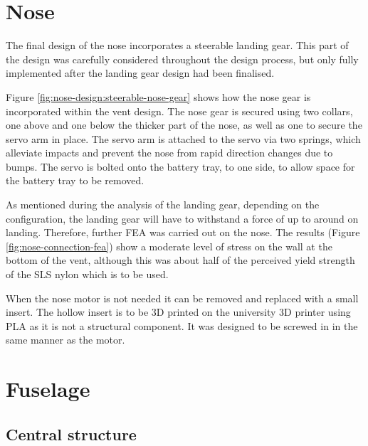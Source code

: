 \documentclass[../../main.tex]{subfiles}
\begin{document}
\section{Nose} \label{sec:final-design-proposal:nose}

The final design of the nose incorporates a steerable landing gear.
This part of the design was carefully considered throughout the design process, but only fully implemented after the landing gear design had been finalised. 


Figure \ref{fig:nose-design:steerable-nose-gear} shows how the nose gear is incorporated within the vent design.
The nose gear is secured using two collars, one above and one below the thicker part of the nose, as well as one to secure the servo arm in place.
The servo arm is attached to the servo via two springs, which alleviate impacts and prevent the nose from rapid direction changes due to bumps.
The servo is bolted onto the battery tray, to one side, to allow space for the battery tray to be removed. 

As mentioned during the analysis of the landing gear, depending on the configuration, the landing gear will have to withstand a force of up to around  on landing.
Therefore, further FEA was carried out on the nose.
The results (Figure \ref{fig:nose-connection-fea}) show a moderate level of stress on the wall at the bottom of the vent, although this was about half of the perceived yield strength of the SLS nylon which is to be used. 



When the nose motor is not needed it can be removed and replaced with a small insert.
The hollow insert is to be 3D printed on the university 3D printer using PLA as it is not a structural component.
It was designed to be screwed in in the same manner as the motor. 

\section{Fuselage} \label{sec:final-design-proposal:fuselage}

\subsection{Central structure} \label{sec:final-design-proposal:fuselage:central-structure}
\end{document}
